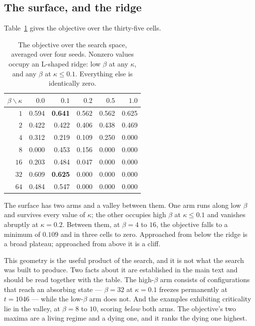 \documentclass[man,12pt,floatsintext,donotrepeattitle]{apa7}
\begin{document}
\subsection*{The surface, and the ridge}

Table~\ref{tab:miner-surface} gives the objective over the thirty-five cells.

\begin{table}[htbp]
\centering
\caption{The objective over the search space, averaged over four seeds. Nonzero
values occupy an L-shaped ridge: low $\beta$ at any $\kappa$, and any $\beta$ at
$\kappa \le 0.1$. Everything else is identically zero.}
\label{tab:miner-surface}
\begin{tabular}{rrrrrr}
\toprule
$\beta \backslash \kappa$ & $0.0$ & $0.1$ & $0.2$ & $0.5$ & $1.0$ \\
\midrule
$1$  & 0.594 & \textbf{0.641} & 0.562 & 0.562 & 0.625 \\
$2$  & 0.422 & 0.422 & 0.406 & 0.438 & 0.469 \\
$4$  & 0.312 & 0.219 & 0.109 & 0.250 & 0.000 \\
$8$  & 0.000 & 0.453 & 0.156 & 0.000 & 0.000 \\
$16$ & 0.203 & 0.484 & 0.047 & 0.000 & 0.000 \\
$32$ & 0.609 & \textbf{0.625} & 0.000 & 0.000 & 0.000 \\
$64$ & 0.484 & 0.547 & 0.000 & 0.000 & 0.000 \\
\bottomrule
\end{tabular}
\end{table}

The surface has two arms and a valley between them. One arm runs along low
$\beta$ and survives every value of $\kappa$; the other occupies high $\beta$ at
$\kappa \le 0.1$ and vanishes abruptly at $\kappa = 0.2$. Between them, at
$\beta = 4$ to $16$, the objective falls to a minimum of $0.109$ and in three
cells to zero. Approached from below the ridge is a broad plateau; approached
from above it is a cliff.

This geometry is the useful product of the search, and it is not what the search
was built to produce. Two facts about it are established in the main text and
should be read together with the table. The high-$\beta$ arm consists of
configurations that reach an absorbing state --- $\beta = 32$ at $\kappa = 0.1$
freezes permanently at $t=1046$ --- while the low-$\beta$ arm does not. And the
examples exhibiting criticality lie in the valley, at $\beta = 8$ to $10$,
scoring \emph{below} both arms. The objective's two maxima are a living regime
and a dying one, and it ranks the dying one highest.
\end{document}
